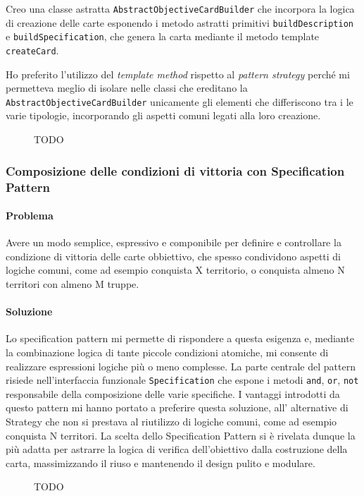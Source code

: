\documentclass[a4paper,12pt]{report}
\begin{document}
Creo una classe astratta \texttt{AbstractObjectiveCardBuilder} che incorpora la logica di creazione delle carte esponendo i metodo astratti primitivi \texttt{buildDescription} e \texttt{buildSpecification}, che genera la carta mediante il metodo template \texttt{createCard}.

Ho preferito l'utilizzo del \textit{template method} rispetto al \textit{pattern strategy} perché mi permetteva meglio di isolare nelle classi che ereditano la \\\texttt{AbstractObjectiveCardBuilder} unicamente gli elementi che differiscono tra i le varie tipologie, incorporando gli aspetti comuni legati alla loro creazione.
\begin{figure}[H]
	\centering
	
	\caption{TODO}
\end{figure}
\subsubsection{Composizione delle condizioni di vittoria con Specification Pattern}
\paragraph{Problema}
Avere un modo semplice, espressivo e componibile per definire e controllare la condizione di vittoria delle carte obbiettivo, che spesso condividono aspetti di logiche comuni, come ad esempio conquista X territorio, o conquista almeno N territori con almeno M truppe.
\paragraph{Soluzione}
Lo specification pattern mi permette di rispondere a questa esigenza e, mediante la combinazione logica di tante piccole condizioni atomiche, mi consente di realizzare espressioni logiche più o meno complesse. La parte centrale del pattern risiede nell'interfaccia funzionale \texttt{Specification} che espone i metodi \texttt{and}, \texttt{or}, \texttt{not} responsabile della composizione delle varie specifiche.
I vantaggi introdotti da questo pattern mi hanno portato a preferire questa soluzione, all' alternative di Strategy che non si prestava al riutilizzo di logiche comuni, come ad esempio conquista N territori.
La scelta dello Specification Pattern si è rivelata dunque la più adatta per astrarre la logica di verifica dell'obiettivo dalla costruzione della carta, massimizzando il riuso e mantenendo il design pulito e modulare.
\begin{figure}[H]
	\centering
	
	\caption{TODO}
\end{figure}
\end{document}
